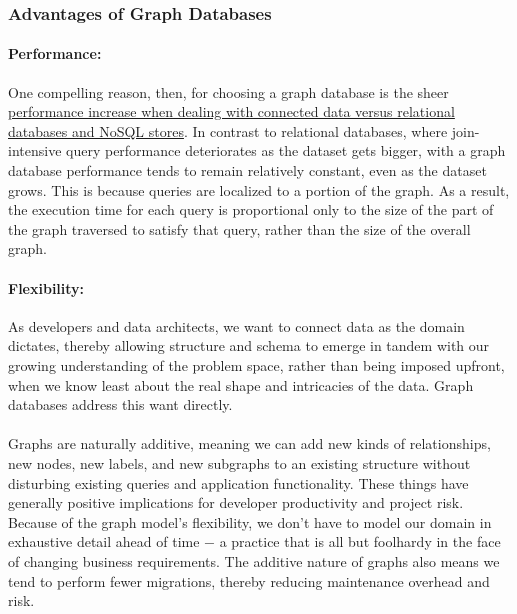 \documentclass[10pt,a4paper]{article}
\newcommand{\nline}{\\~\\}
\begin{document}
\subsubsection{Advantages of Graph Databases}
\paragraph{Performance:}
One compelling reason, then, for choosing a graph database is the sheer \uline{performance increase when dealing with connected data versus relational databases and NoSQL stores}. In contrast to relational databases, where join-intensive query performance deteriorates as the dataset gets bigger, with a graph database performance tends to remain relatively constant, even as the dataset grows. This is because queries are localized to a portion of the graph. As a result, the execution time for each query is proportional only to the size of the part of the graph traversed to satisfy that query, rather than the size of the overall graph.
\paragraph{Flexibility:}
As developers and data architects, we want to connect data as the domain dictates, thereby allowing structure and schema to emerge in tandem with our growing understanding of the problem space, rather than being imposed upfront, when we know least about the real shape and intricacies of the data. Graph databases address this want directly. 
\nline
Graphs are naturally additive, meaning we can add new kinds of relationships, new nodes, new labels, and new subgraphs to an existing structure without disturbing existing queries and application functionality. These things have generally positive implications for developer productivity and project risk. Because of the graph model’s flexibility, we don’t have to model our domain in exhaustive detail ahead of time $-$ a practice that is all but foolhardy in the face of changing business requirements. The additive nature of graphs also means we tend to perform fewer migrations, thereby reducing maintenance overhead and risk.
\end{document}
